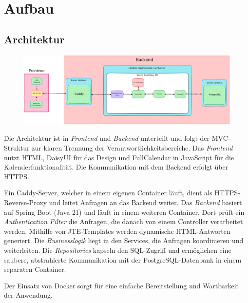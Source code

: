 
\chapter{Aufbau}
\label{ch:aufbau}

\section{Architektur}
\begin{figure}[ht]
    \centering
    \includegraphics[width=\textwidth]{figures/architecture}
    \label{fig:architekturmodell}
\end{figure}
Die Architektur ist in \textit{Frontend} und \textit{Backend} unterteilt und folgt der \gls{MVC-Struktur} zur klaren Trennung der Verantwortlichkeitsbereiche.
Das \textit{Frontend} nutzt \gls{HTML}, \gls{DaisyUI} für das Design und \gls{FullCalendar} in \gls{JavaScript} für die Kalenderfunktionalität.
Die Kommunikation mit dem Backend erfolgt über \gls{HTTPS}.

Ein \gls{Caddy}-Server, welcher in einem eigenen \gls{Container} läuft, dient als \gls{HTTPS-Reverse-Proxy} und leitet Anfragen an das Backend weiter.
Das \textit{Backend} basiert auf \gls{Spring Boot} (Java 21) und läuft in einem weiteren \gls{Container}.
Dort prüft ein \textit{Authentication Filter} die Anfragen, die danach von einem \gls{Controller} verarbeitet werden.
Mithilfe von \gls{JTE}-Templates werden dynamische HTML-Antworten generiert.
Die \textit{Businesslogik} liegt in den \gls{Services}, die Anfragen koordinieren und weiterleiten.
Die \textit{Repositories} kapseln den SQL-Zugriff und ermöglichen eine saubere, abstrahierte Kommunikation
mit der \gls{PostgreSQL}-Datenbank in einem separaten \gls{Container}.

Der Einsatz von \gls{Docker} sorgt für eine einfache Bereitstellung und Wartbarkeit der Anwendung.
\clearpage

